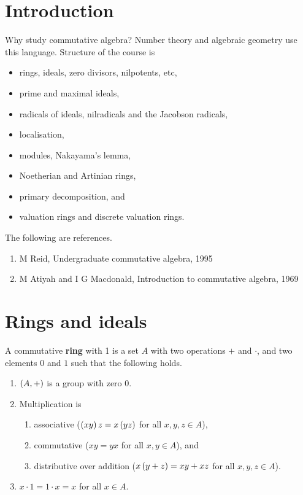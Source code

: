 \def\module{M4P55 Commutative Algebra}
\def\lecturer{Prof Alexei Skorobogatov}
\def\term{Autumn 2018}

\def\thm{section}







\section{Introduction}


Why study commutative algebra? Number theory and algebraic geometry use this language. Structure of the course is
\begin{itemize}
\item rings, ideals, zero divisors, nilpotents, etc,
\item prime and maximal ideals,
\item radicals of ideals, nilradicals and the Jacobson radicals,
\item localisation,
\item modules, Nakayama's lemma,
\item Noetherian and Artinian rings,
\item primary decomposition, and
\item valuation rings and discrete valuation rings.
\end{itemize}
The following are references.
\begin{enumerate}
\item M Reid, Undergraduate commutative algebra, 1995
\item M Atiyah and I G Macdonald, Introduction to commutative algebra, 1969
\end{enumerate}

\pagebreak

\section{Rings and ideals}

\begin{definition}
A commutative \textbf{ring} with 1 is a set $ A $ with two operations $ + $ and $ \cdot $, and two elements $ 0 $ and $ 1 $ such that the following holds.
\begin{enumerate}
\item $ \left( A, + \right) $ is a group with zero $ 0 $.
\item Multiplication is
\begin{enumerate}
\item associative ($ \left( xy \right)z = x\left( yz \right) $ for all $ x, y, z \in A $),
\item commutative ($ xy = yx $ for all $ x, y \in A $), and
\item distributive over addition ($ x\left( y + z \right) = xy + xz $ for all $ x, y, z \in A $).
\end{enumerate}
\item $ x \cdot 1 = 1 \cdot x = x $ for all $ x \in A $.
\end{enumerate}
\end{definition}

